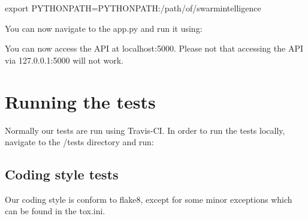 \documentclass[letterpaper,10pt,english]{sphinxmanual}
\begin{document}
\begin{sphinxVerbatim}[commandchars=\\\{\}]
export PYTHONPATH=\PYGZdl{}PYTHONPATH:/path/of/swarm\PYGZhy{}intelligence
\end{sphinxVerbatim}

You can now navigate to the app.py and run it using:

\begin{sphinxVerbatim}[commandchars=\\\{\}]
 
 
\end{sphinxVerbatim}

You can now access the API at localhost:5000. Please not that accessing the API via 127.0.0.1:5000 will not work.


\section{Running the tests}
\label{\detokenize{installation:running-the-tests}}
Normally our tests are run using Travis-CI. In order to run the tests locally, navigate to the /tests directory and run:

\begin{sphinxVerbatim}[commandchars=\\\{\}]
\end{sphinxVerbatim}


\subsection{Coding style tests}
\label{\detokenize{installation:coding-style-tests}}
Our coding style is conform to flake8, except for some minor exceptions which can be found in the tox.ini.
\end{document}
